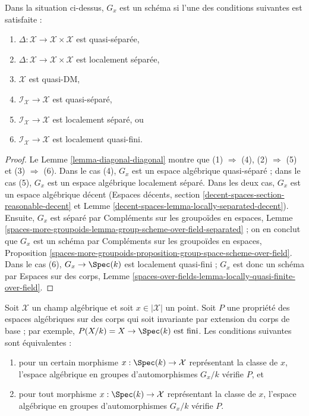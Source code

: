 \begin{lemma}
\label{lemma-automorphism-group-scheme}
Dans la situation ci-dessus, $G_x$ est un schéma si l'une des conditions
suivantes est satisfaite :
\begin{enumerate}
\item $\Delta : \mathcal{X} \to \mathcal{X} \times \mathcal{X}$
est quasi-séparée,
\item $\Delta : \mathcal{X} \to \mathcal{X} \times \mathcal{X}$
est localement séparée,
\item $\mathcal{X}$ est quasi-DM,
\item $\mathcal{I}_\mathcal{X} \to \mathcal{X}$
est quasi-séparé,
\item $\mathcal{I}_\mathcal{X} \to \mathcal{X}$
est localement séparé, ou
\item $\mathcal{I}_\mathcal{X} \to \mathcal{X}$
est localement quasi-fini.
\end{enumerate}
\end{lemma}

\begin{proof}
Le Lemme \ref{lemma-diagonal-diagonal} montre que
(1) $\Rightarrow$ (4), (2) $\Rightarrow$ (5) et (3) $\Rightarrow$ (6).
Dans le cas (4), $G_x$ est un espace algébrique quasi-séparé ; dans le cas
(5), $G_x$ est un espace algébrique localement séparé.
Dans les deux cas, $G_x$ est un espace algébrique décent
(Espaces décents,
section \ref{decent-spaces-section-reasonable-decent} et
Lemme \ref{decent-spaces-lemma-locally-separated-decent}).
Ensuite, $G_x$ est séparé par Compléments sur les groupoïdes en espaces,
Lemme \ref{spaces-more-groupoids-lemma-group-scheme-over-field-separated} ;
on en conclut que $G_x$ est un schéma par Compléments sur les groupoïdes en
espaces, Proposition
\ref{spaces-more-groupoids-proposition-group-space-scheme-over-field}.
Dans le cas (6), $G_x \to \Spec(k)$ est localement quasi-fini ; $G_x$ est donc
un schéma par Espaces sur des corps,
Lemme \ref{spaces-over-fields-lemma-locally-quasi-finite-over-field}.
\end{proof}

\begin{lemma}
\label{lemma-property-automorphism-groups}
Soit $\mathcal{X}$ un champ algébrique et soit $x \in |\mathcal{X}|$ un point.
Soit $P$ une propriété des espaces algébriques sur des corps qui soit
invariante par extension du corps de base ; par exemple,
$P(X/k) = X \to \Spec(k)\text{ est fini}$.
Les conditions suivantes sont équivalentes :
\begin{enumerate}
\item pour un certain morphisme $x : \Spec(k) \to \mathcal{X}$ représentant
la classe de $x$, l'espace algébrique en groupes d'automorphismes $G_x/k$
vérifie $P$, et
\item pour tout morphisme $x : \Spec(k) \to \mathcal{X}$ représentant
la classe de $x$, l'espace algébrique en groupes d'automorphismes $G_x/k$
vérifie $P$.
\end{enumerate}
\end{lemma}

